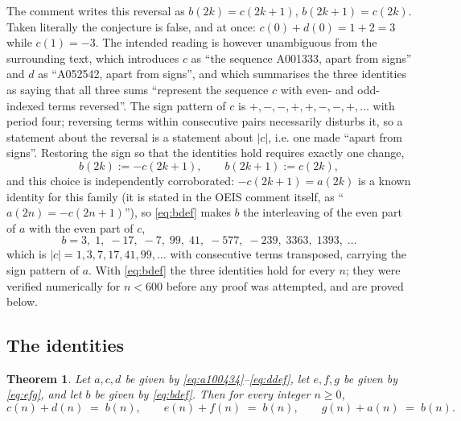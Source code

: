 \documentclass[11pt]{article}
\theoremstyle{plain}
\newtheorem{theorem}{Theorem}[section]
\theoremstyle{definition}
\theoremstyle{remark}
\numberwithin{equation}{section}
\begin{document}
The comment writes this reversal as $b(2k) = c(2k+1)$, $b(2k+1) = c(2k)$. Taken literally the
conjecture is false, and at once: $c(0) + d(0) = 1 + 2 = 3$ while $c(1) = -3$. The intended
reading is however unambiguous from the surrounding text, which introduces $c$ as ``the sequence
A001333, apart from signs'' and $d$ as ``A052542, apart from signs'', and which summarises the
three identities as saying that all three sums ``represent the sequence $c$ with even- and
odd-indexed terms reversed''. The sign pattern of $c$ is $+,-,-,+,+,-,-,+,\dots$ with period
four; reversing terms within consecutive pairs necessarily disturbs it, so a statement about the
reversal is a statement about $|c|$, i.e. one made ``apart from signs''. Restoring the sign so
that the identities hold requires exactly one change,
\begin{equation}
  b(2k) := -c(2k+1), \qquad b(2k+1) := c(2k),
  \label{eq:bdef}
\end{equation}
and this choice is independently corroborated: $-c(2k+1) = a(2k)$ is a known identity for this
family (it is stated in the OEIS comment itself, as ``$a(2n) = -c(2n+1)$''), so \eqref{eq:bdef}
makes $b$ the interleaving of the even part of $a$ with the even part of $c$,
\[
  b = 3,\; 1,\; -17,\; -7,\; 99,\; 41,\; -577,\; -239,\; 3363,\; 1393,\; \ldots
\]
which is $|c| = 1, 3, 7, 17, 41, 99, \ldots$ with consecutive terms transposed, carrying the sign
pattern of $a$. With \eqref{eq:bdef} the three identities hold for every $n$; they were verified
numerically for $n < 600$ before any proof was attempted, and are proved below.

\subsection{The identities}

\begin{theorem}
\label{thm:a100434}
Let $a, c, d$ be given by \eqref{eq:a100434}--\eqref{eq:ddef}, let $e, f, g$ be given by
\eqref{eq:efg}, and let $b$ be given by \eqref{eq:bdef}. Then for every integer $n \ge 0$,
\[
  c(n) + d(n) \;=\; b(n),
  \qquad
  e(n) + f(n) \;=\; b(n),
  \qquad
  g(n) + a(n) \;=\; b(n).
\]
\end{theorem}
\end{document}
